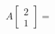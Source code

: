\documentclass[preview]{standalone}
\begin{document}
\begin{align*}
A\begin{bmatrix} 2 \\ 1 \end{bmatrix} =
\end{align*}
\end{document}

